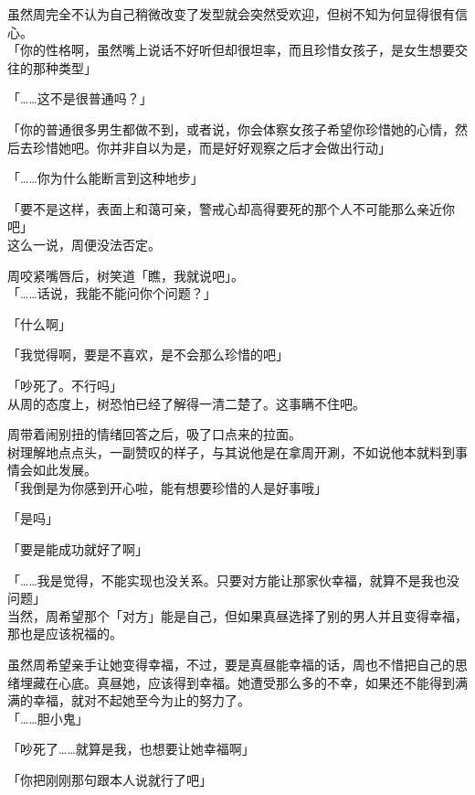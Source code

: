 虽然周完全不认为自己稍微改变了发型就会突然受欢迎，但树不知为何显得很有信心。\\

「你的性格啊，虽然嘴上说话不好听但却很坦率，而且珍惜女孩子，是女生想要交往的那种类型」

「……这不是很普通吗？」

「你的普通很多男生都做不到，或者说，你会体察女孩子希望你珍惜她的心情，然后去珍惜她吧。你并非自以为是，而是好好观察之后才会做出行动」

「……你为什么能断言到这种地步」

「要不是这样，表面上和蔼可亲，警戒心却高得要死的那个人不可能那么亲近你吧」\\

这么一说，周便没法否定。

周咬紧嘴唇后，树笑道「瞧，我就说吧」。\\

「……话说，我能不能问你个问题？」

「什么啊」

「我觉得啊，要是不喜欢，是不会那么珍惜的吧」

「吵死了。不行吗」\\

从周的态度上，树恐怕已经了解得一清二楚了。这事瞒不住吧。

周带着闹别扭的情绪回答之后，吸了口点来的拉面。\\

树理解地点点头，一副赞叹的样子，与其说他是在拿周开涮，不如说他本就料到事情会如此发展。\\

「我倒是为你感到开心啦，能有想要珍惜的人是好事哦」

「是吗」

「要是能成功就好了啊」

「……我是觉得，不能实现也没关系。只要对方能让那家伙幸福，就算不是我也没问题」\\

当然，周希望那个「对方」能是自己，但如果真昼选择了别的男人并且变得幸福，那也是应该祝福的。

虽然周希望亲手让她变得幸福，不过，要是真昼能幸福的话，周也不惜把自己的思绪埋藏在心底。真昼她，应该得到幸福。她遭受那么多的不幸，如果还不能得到满满的幸福，就对不起她至今为止的努力了。\\

「……胆小鬼」

「吵死了……就算是我，也想要让她幸福啊」

「你把刚刚那句跟本人说就行了吧」

